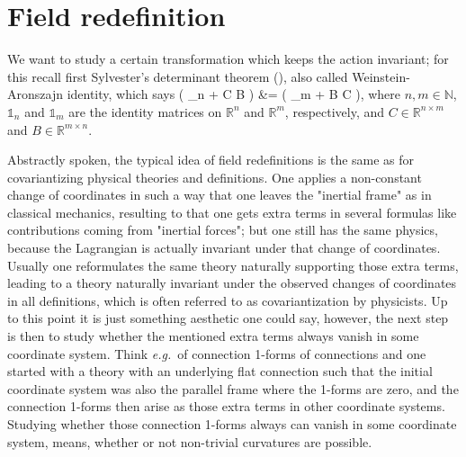 \section{Field redefinition}\label{FieldRedefSection}

We want to study a certain transformation which keeps the action invariant; for this recall first Sylvester's determinant theorem (\cite[Appendix B; page 271]{DeterminantenTheorem}), also called Weinstein-Aronszajn identity, which says
\ba\label{SylvestersDeterminante}
\mleft( _n + C B \mright)
&=
\mleft( _m + B C \mright),
\ea
where $n, m \in \mathbb{N}$, $\mathds{1}_n$ and $\mathds{1}_m$ are the identity matrices on $\mathbb{R}^n$ and $\mathbb{R}^m$, respectively, and $C \in \mathbb{R}^{n \times m}$ and $B \in \mathbb{R}^{m \times n}$. 

Abstractly spoken, the typical idea of field redefinitions is the same as for covariantizing physical theories and definitions. One applies a non-constant change of coordinates in such a way that one leaves the "inertial frame" as in classical mechanics, resulting to that one gets extra terms in several formulas like contributions coming from "inertial forces"; but one still has the same physics, because the Lagrangian is actually invariant under that change of coordinates. Usually one reformulates the same theory naturally supporting those extra terms, leading to a theory naturally invariant under the observed changes of coordinates in all definitions, which is often referred to as covariantization by physicists. Up to this point it is just something aesthetic one could say, however, the next step is then to study whether the mentioned extra terms always vanish in some coordinate system. Think \textit{e.g.}~of connection 1-forms of connections and one started with a theory with an underlying flat connection such that the initial coordinate system was also the parallel frame where the 1-forms are zero, and the connection 1-forms then arise as those extra terms in other coordinate systems. Studying whether those connection 1-forms always can vanish in some coordinate system, means, whether or not non-trivial curvatures are possible.


